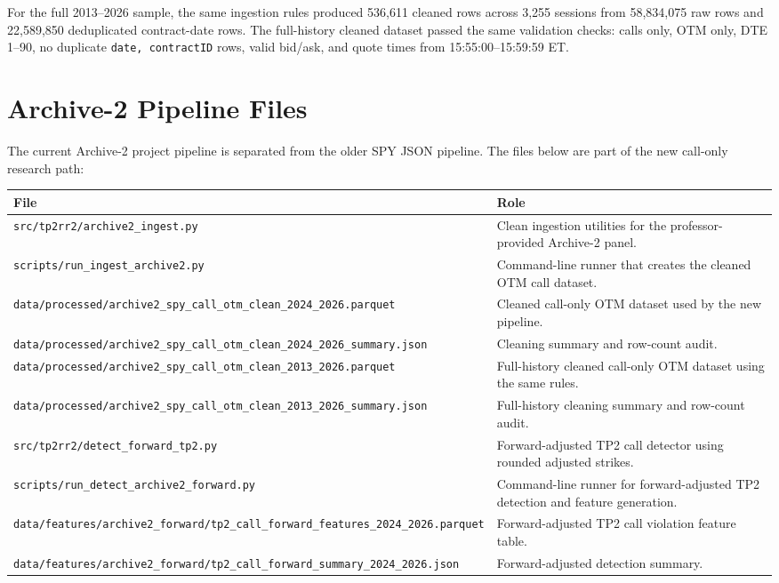 \documentclass[11pt]{article}
\begin{document}
For the full 2013--2026 sample, the same ingestion rules produced 536,611
cleaned rows across 3,255 sessions from 58,834,075 raw rows and 22,589,850
deduplicated contract-date rows. The full-history cleaned dataset passed the
same validation checks: calls only, OTM only, DTE 1--90, no duplicate
\texttt{date, contractID} rows, valid bid/ask, and quote times from
15:55:00--15:59:59 ET.

\section*{Archive-2 Pipeline Files}

The current Archive-2 project pipeline is separated from the older SPY JSON
pipeline. The files below are part of the new call-only research path:

\begin{longtable}{>{\raggedright\arraybackslash}p{}p{}}
\toprule
\textbf{File} & \textbf{Role} \\
\midrule
\texttt{src/tp2rr2/archive2\_ingest.py} & Clean ingestion utilities for the professor-provided Archive-2 panel. \\
\texttt{scripts/run\_ingest\_archive2.py} & Command-line runner that creates the cleaned OTM call dataset. \\
\texttt{data/processed/archive2\_spy\_call\_otm\_clean\_2024\_2026.parquet} & Cleaned call-only OTM dataset used by the new pipeline. \\
\texttt{data/processed/archive2\_spy\_call\_otm\_clean\_2024\_2026\_summary.json} & Cleaning summary and row-count audit. \\
\texttt{data/processed/archive2\_spy\_call\_otm\_clean\_2013\_2026.parquet} & Full-history cleaned call-only OTM dataset using the same rules. \\
\texttt{data/processed/archive2\_spy\_call\_otm\_clean\_2013\_2026\_summary.json} & Full-history cleaning summary and row-count audit. \\
\texttt{src/tp2rr2/detect\_forward\_tp2.py} & Forward-adjusted TP2 call detector using rounded adjusted strikes. \\
\texttt{scripts/run\_detect\_archive2\_forward.py} & Command-line runner for forward-adjusted TP2 detection and feature generation. \\
\texttt{data/features/archive2\_forward/tp2\_call\_forward\_features\_2024\_2026.parquet} & Forward-adjusted TP2 call violation feature table. \\
\texttt{data/features/archive2\_forward/tp2\_call\_forward\_summary\_2024\_2026.json} & Forward-adjusted detection summary. \\

\end{longtable}
\end{document}
